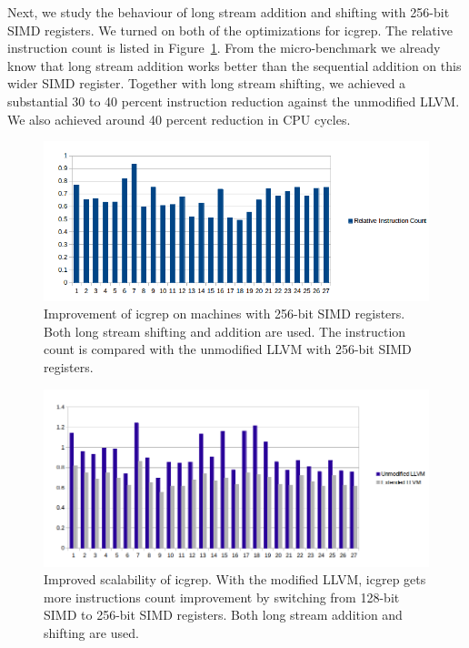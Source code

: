 Next, we study the behaviour of long stream addition and shifting with 256-bit SIMD registers. We turned on both of the optimizations for icgrep. The relative instruction count is listed in Figure~\ref{fig:inst_count_all_256}. From the micro-benchmark we already know that long stream addition works better than the sequential addition on this wider SIMD register. Together with long stream shifting, we achieved a substantial 30 to 40 percent instruction reduction against the unmodified LLVM\@. We also achieved around 40 percent reduction in CPU cycles.

\begin{figure}[htbp!]
\centering
\includegraphics[width=140mm]{draw/inst_count_all_256.png}
\caption[Improvement of icgrep on machines with 256-bit SIMD registers]{Improvement of icgrep on machines with 256-bit SIMD registers. Both long stream shifting and addition are used. The instruction count is compared with the unmodified LLVM with 256-bit SIMD registers.}
\label{fig:inst_count_all_256}
\end{figure}

\begin{figure}[htbp!]
\centering
\includegraphics[width=140mm]{draw/inst_count_scalability.png}
\caption[Improved scalability of icgrep]{Improved scalability of icgrep. With the modified LLVM, icgrep gets more instructions count improvement by switching from 128-bit SIMD to 256-bit SIMD registers. Both long stream addition and shifting are used.}
\label{fig:inst_count_scalability}
\end{figure}

